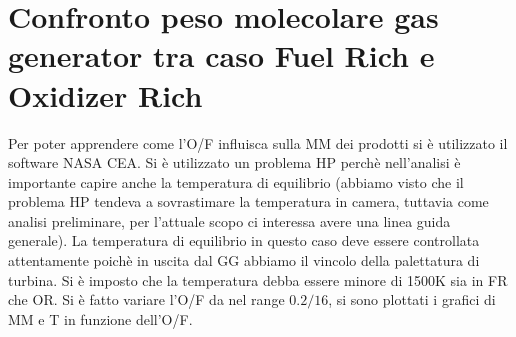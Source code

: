 \section{Confronto peso molecolare gas generator tra caso Fuel Rich e Oxidizer Rich}
\label{appendix:confronto peso molecolare}


Per poter apprendere come l'O/F influisca sulla MM dei prodotti si è utilizzato il software NASA CEA. Si è utilizzato un problema HP perchè nell'analisi è importante capire anche la temperatura di equilibrio (abbiamo visto che il problema HP tendeva a sovrastimare la temperatura in camera, tuttavia come analisi preliminare, per l'attuale scopo ci interessa avere una linea guida generale). La temperatura di equilibrio in questo caso deve essere controllata attentamente poichè in uscita dal GG abbiamo il vincolo della palettatura di turbina. Si è imposto che la temperatura debba essere minore di 1500K sia in FR che OR. Si è fatto variare l'O/F da nel range $0.2 / 16$, si sono plottati i grafici di MM e T in funzione dell'O/F.